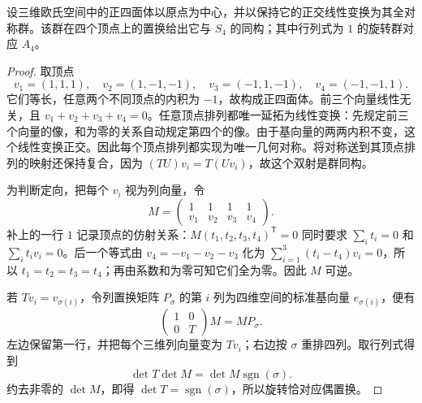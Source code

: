 \begin{proposition}[正四面体]\label{b1:prop:tetrahedral-group}
	设三维欧氏空间中的正四面体以原点为中心，并以保持它的正交线性变换为其全对称群。该群在四个顶点上的置换给出它与 \(S_4\) 的同构；其中行列式为 \(1\) 的旋转群对应 \(A_4\)。
\end{proposition}
\begin{proof}
	取顶点
	\begin{equation}\label{b1:eq:tetrahedron-vertices}
		v_1=(1,1,1),\quad v_2=(1,-1,-1),\quad v_3=(-1,1,-1),\quad v_4=(-1,-1,1).
	\end{equation}
	它们等长，任意两个不同顶点的内积为 \(-1\)，故构成正四面体。前三个向量线性无关，且 \(v_1+v_2+v_3+v_4=0\)。任意顶点排列都唯一延拓为线性变换：先规定前三个向量的像，和为零的关系自动规定第四个的像。由于基向量的两两内积不变，这个线性变换正交。因此每个顶点排列都实现为唯一几何对称。将对称送到其顶点排列的映射还保持复合，因为 \((TU)v_i=T(Uv_i)\)，故这个双射是群同构。

	为判断定向，把每个 \(v_i\) 视为列向量，令
	\[
		M=\begin{pmatrix}
			1&1&1&1\\
			v_1&v_2&v_3&v_4
		\end{pmatrix}.
	\]
	补上的一行 \(1\) 记录顶点的仿射关系：\(M(t_1,t_2,t_3,t_4)^{\mathsf T}=0\) 同时要求 \(\sum_i t_i=0\) 和 \(\sum_i t_iv_i=0\)。后一个等式由 \(v_4=-v_1-v_2-v_3\) 化为 \(\sum_{i=1}^3(t_i-t_4)v_i=0\)，所以 \(t_1=t_2=t_3=t_4\)；再由系数和为零可知它们全为零。因此 \(M\) 可逆。

	若 \(Tv_i=v_{\sigma(i)}\)，令列置换矩阵 \(P_\sigma\) 的第 \(i\) 列为四维空间的标准基向量 \(e_{\sigma(i)}\)，便有
	\[
		\begin{pmatrix}1&0\\0&T\end{pmatrix}M=MP_\sigma.
	\]
	左边保留第一行，并把每个三维列向量变为 \(Tv_i\)；右边按 \(\sigma\) 重排四列。取行列式得到
	\[
		\det T\det M=\det M\operatorname{sgn}(\sigma).
	\]
	约去非零的 \(\det M\)，即得 \(\det T=\operatorname{sgn}(\sigma)\)，所以旋转恰对应偶置换。
\end{proof}


